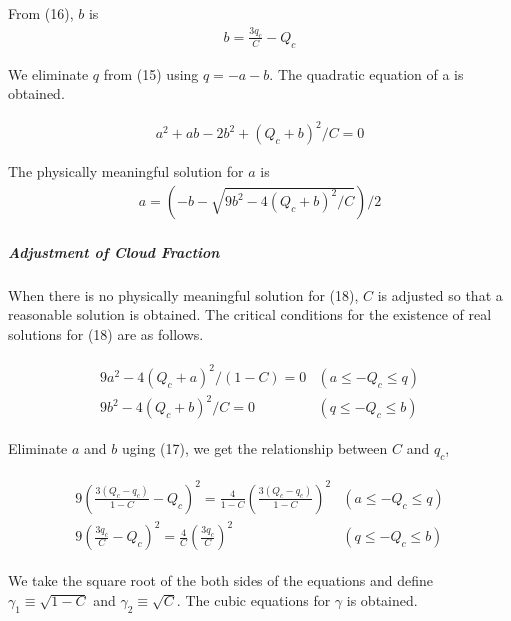 From (16), \(b\) is \begin{eqnarray}
b=\frac{3 q_{c}}{C}-Q_{c}
\end{eqnarray}

We eliminate \(q\) from (15) using \(q = -a-b\). The quadratic equation
of a is obtained.

\begin{eqnarray}
a^{2}+ab-2 b^{2}+\left(Q_{c}+b\right)^{2} / C=0
\label{E08-17}
\end{eqnarray}

The physically meaningful solution for \(a\) is \begin{eqnarray}
a=\left(-b-\sqrt{9 b^{2}-4\left(Q_{c}+b\right)^{2} / C}\right) / 2
\label{E08-18}
\end{eqnarray}

\hypertarget{adjustment-of-cloud-fraction}{%
\subparagraph{Adjustment of Cloud
Fraction}\label{adjustment-of-cloud-fraction}}

When there is no physically meaningful solution for (18), \(C\) is
adjusted so that a reasonable solution is obtained. The critical
conditions for the existence of real solutions for (18) are as follows.

\begin{eqnarray}
\begin{array}{ll}
9 a^{2}-4\left(Q_{c}+a\right)^{2} /(1-C)=0 & \left(a \leq-Q_{c} \leq q\right) \\
9 b^{2}-4\left(Q_{c}+b\right)^{2} / C=0 & \left(q \leq-Q_{c} \leq b\right)
\end{array}
\end{eqnarray}

Eliminate \(a\) and \(b\) uging (17), we get the relationship between
\(C\) and \(q_c\),

\begin{eqnarray}
\begin{array}{ll}
9\left(\frac{3\left(Q_{c}-q_{c}\right)}{1-C}-Q_{c}\right)^{2}=\frac{4}{1-C}\left(\frac{3\left(Q_{c}-q_{c}\right)}{1-C}\right)^{2} & \left(a \leq-Q_{c} \leq q\right) \\
9\left(\frac{3 q_{c}}{C}-Q_{c}\right)^{2}=\frac{4}{C}\left(\frac{3 q_{c}}{C}\right)^{2} & \left(q \leq-Q_{c} \leq b\right)
\end{array}
\end{eqnarray}

We take the square root of the both sides of the equations and define
\(\gamma_{1} \equiv\sqrt{1-C}\) and \(\gamma_{2} \equiv\sqrt{C}\). The
cubic equations for \(\gamma\) is obtained.

